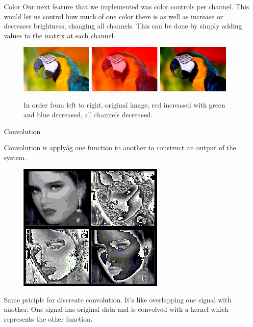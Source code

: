\documentclass{beamer}
\begin{document}
\begin{frame}{Color}
Our next feature that we implemented was color controls per channel. This would let us control how much of one color there is as well as increase or decreases brightness, changing all channels. This can be done by simply adding values to the matrix at each channel.

\begin{figure}[ht]
\includegraphics[width=1.4in]{parrot.jpg}
\hspace{.1in} 
\includegraphics[width=1.4in]{parrotout1.jpg}
\hspace{.1in}
\includegraphics[width=1.4in]{parrotout2.jpg}
\hspace{.1in}
\caption{In order from left to right, original image, red increased with green and blue decreased, all channels decreased.}
\end{figure}
\end{frame}

\begin{frame}{Convolution}

Convolution is applyâg one function to another to construct an output of the system. 
\newline

\begin{figure}
\begin{center}
\includegraphics[width= 1.4 in]{convolution.png}
\end{center}
\end{figure}
Same priciple for discreate convolution. It's like overlapping one signal with another. One signal has original data and is convolved with a kernel which represents the other function. 


\end{frame}
\end{document}
